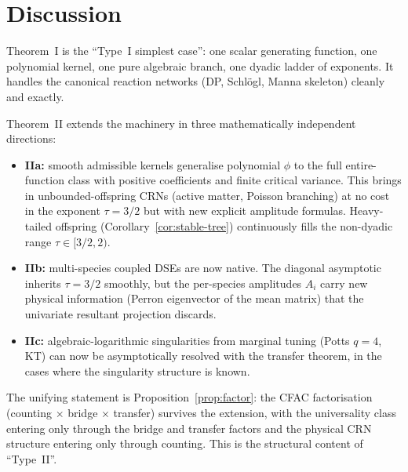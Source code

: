 \documentclass[11pt,a4paper]{article}
\theoremstyle{plain}
\theoremstyle{definition}
\begin{document}
\section{Discussion}
\label{sec:disc}

Theorem~I is the ``Type~I simplest case'': one scalar generating
function, one polynomial kernel, one pure algebraic branch, one
dyadic ladder of exponents.  It handles the canonical reaction
networks (DP, Schl\"ogl, Manna skeleton) cleanly and exactly.

Theorem~II extends the machinery in three mathematically independent
directions:

\begin{itemize}[leftmargin=1.2em, itemsep=1pt]
  \item \textbf{IIa:} smooth admissible kernels generalise polynomial
    $\phi$ to the full entire-function class with positive
    coefficients and finite critical variance.  This brings in
    unbounded-offspring CRNs (active matter, Poisson branching) at no
    cost in the exponent $\tau = 3/2$ but with new explicit amplitude
    formulas.  Heavy-tailed offspring (Corollary~\ref{cor:stable-tree})
    continuously fills the non-dyadic range $\tau \in [3/2, 2)$.
  \item \textbf{IIb:} multi-species coupled DSEs are now native.
    The diagonal asymptotic inherits $\tau = 3/2$ smoothly, but the
    per-species amplitudes $A_i$ carry new physical information
    (Perron eigenvector of the mean matrix) that the univariate
    resultant projection discards.
  \item \textbf{IIc:} algebraic-logarithmic singularities from
    marginal tuning (Potts $q=4$, KT) can now be asymptotically
    resolved with the transfer theorem, in the cases where the
    singularity structure is known.
\end{itemize}

The unifying statement is Proposition~\ref{prop:factor}: the CFAC
factorisation (counting $\times$ bridge $\times$ transfer) survives
the extension, with the universality class entering only through
the bridge and transfer factors and the physical CRN structure
entering only through counting.  This is the structural content of
``Type~II''.
\end{document}
